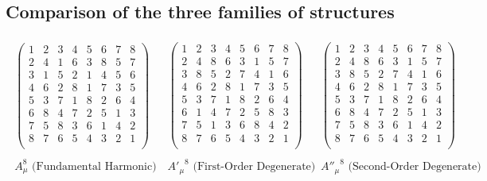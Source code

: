 \documentclass{article}
\begin{document}
\subsection{Comparison of the three families of structures}


\[
\begin{array}{ccc}
\begin{array}{c}
\begin{pmatrix}
1 & 2 & 3 & 4 & 5 & 6 & 7 & 8 \\
2 & 4 & 1 & 6 & 3 & 8 & 5 & 7 \\
3 & 1 & 5 & 2 & 1 & 4 & 5 & 6 \\
4 & 6 & 2 & 8 & 1 & 7 & 3 & 5 \\
5 & 3 & 7 & 1 & 8 & 2 & 6 & 4 \\
6 & 8 & 4 & 7 & 2 & 5 & 1 & 3 \\
7 & 5 & 8 & 3 & 6 & 1 & 4 & 2 \\
8 & 7 & 6 & 5 & 4 & 3 & 2 & 1 \\
\end{pmatrix} \\[4pt] \\
A_\mu^{8} \text{ (Fundamental Harmonic)}
\end{array}
&
\begin{array}{c}
\begin{pmatrix}
1 & 2 & 3 & 4 & 5 & 6 & 7 & 8 \\
2 & 4 & 8 & 6 & 3 & 1 & 5 & 7 \\
3 & 8 & 5 & 2 & 7 & 4 & 1 & 6 \\
4 & 6 & 2 & 8 & 1 & 7 & 3 & 5 \\
5 & 3 & 7 & 1 & 8 & 2 & 6 & 4 \\
6 & 1 & 4 & 7 & 2 & 5 & 8 & 3 \\
7 & 5 & 1 & 3 & 6 & 8 & 4 & 2 \\
8 & 7 & 6 & 5 & 4 & 3 & 2 & 1 \\
\end{pmatrix} \\[4pt] \\
{A'_\mu}^{8}\text{ (First-Order Degenerate)}
\end{array}
&
\begin{array}{c}
\begin{pmatrix}
1 & 2 & 3 & 4 & 5 & 6 & 7 & 8 \\
2 & 4 & 8 & 6 & 3 & 1 & 5 & 7 \\
3 & 8 & 5 & 2 & 7 & 4 & 1 & 6 \\
4 & 6 & 2 & 8 & 1 & 7 & 3 & 5 \\
5 & 3 & 7 & 1 & 8 & 2 & 6 & 4 \\
6 & 8 & 4 & 7 & 2 & 5 & 1 & 3 \\
7 & 5 & 8 & 3 & 6 & 1 & 4 & 2 \\
8 & 7 & 6 & 5 & 4 & 3 & 2 & 1 \\
\end{pmatrix} \\[4pt] \\
{A''_\mu}^{8}\text{ (Second-Order Degenerate)}
\end{array}
\end{array}
\]
\end{document}
